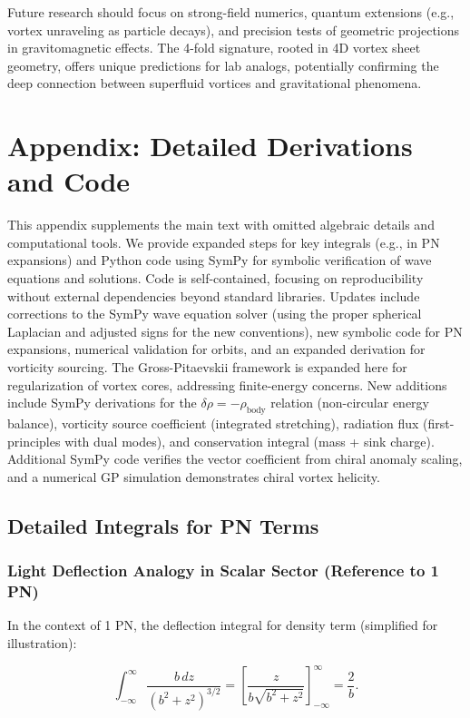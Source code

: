 \documentclass{article}
\begin{document}
Future research should focus on strong-field numerics, quantum extensions (e.g., vortex unraveling as particle decays), and precision tests of geometric projections in gravitomagnetic effects. The 4-fold signature, rooted in 4D vortex sheet geometry, offers unique predictions for lab analogs, potentially confirming the deep connection between superfluid vortices and gravitational phenomena.

\section{Appendix: Detailed Derivations and Code}

This appendix supplements the main text with omitted algebraic details and computational tools. We provide expanded steps for key integrals (e.g., in PN expansions) and Python code using SymPy for symbolic verification of wave equations and solutions. Code is self-contained, focusing on reproducibility without external dependencies beyond standard libraries. Updates include corrections to the SymPy wave equation solver (using the proper spherical Laplacian and adjusted signs for the new conventions), new symbolic code for PN expansions, numerical validation for orbits, and an expanded derivation for vorticity sourcing. The Gross-Pitaevskii framework is expanded here for regularization of vortex cores, addressing finite-energy concerns. New additions include SymPy derivations for the $\delta\rho = -\rho_{\text{body}}$ relation (non-circular energy balance), vorticity source coefficient (integrated stretching), radiation flux (first-principles with dual modes), and conservation integral (mass + sink charge). Additional SymPy code verifies the vector coefficient from chiral anomaly scaling, and a numerical GP simulation demonstrates chiral vortex helicity.

\subsection{Detailed Integrals for PN Terms}

\subsubsection{Light Deflection Analogy in Scalar Sector (Reference to 1 PN)}

In the context of 1 PN, the deflection integral for density term (simplified for illustration):

\[
\int_{-\infty}^{\infty} \frac{b \, dz}{(b^2 + z^2)^{3/2}} = \left[ \frac{z}{b \sqrt{b^2 + z^2}} \right]_{-\infty}^{\infty} = \frac{2}{b}.
\]
\end{document}
